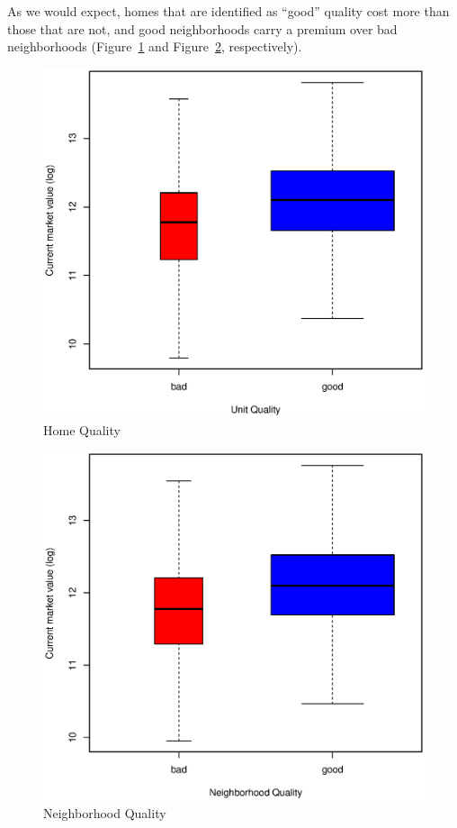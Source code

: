 \documentclass[11pt, fleqn]{article}
\begin{document}
As we would expect, homes that are identified as ``good'' quality cost more than those that are not, and good neighborhoods carry a premium over bad neighborhoods (Figure~\ref{fig:howh} and Figure~\ref{fig:hown}, respectively).

\begin{figure}[!htb]
  \centering
  \includegraphics[scale=.5]{howh.eps}
  \caption{Home Quality}
  \label{fig:howh}
\end{figure}

\begin{figure}[!htb]
  \centering
  \includegraphics[scale=.5]{hown.eps}
  \caption{Neighborhood Quality}
  \label{fig:hown}
\end{figure}
\end{document}
